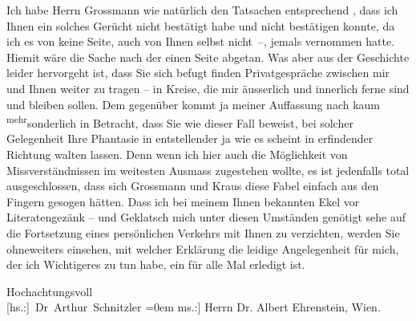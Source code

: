 \pstart
           Ich habe Herrn Grossmann wie natürlich den
               Tatsachen entsprechend \label{K_L02008-2v}\label{K_L02008-2}, dass ich Ihnen ein solches Gerücht nicht
               bestätigt habe und nicht bestätigen konnte, da ich es von keine Seite, auch von Ihnen
               selbst nicht –, jemals vernommen hatte. Hiemit wäre die Sache nach der einen Seite
               abgetan. Was aber aus der Geschichte leider hervorgeht ist, dass Sie sich befugt
               finden Privatge{\pb}spräche zwischen mir und Ihnen weiter zu tragen –
               in Kreise, die mir äusserlich und innerlich ferne sind und bleiben sollen. Dem
               gegenüber kommt ja meine\introOben{}r\introOben{} Auffassung \introOben{}nach\introOben{} kaum \substVorne{}\textsuperscript{mehr}\substDazwischen{}sonderlich\substHinten{} in Betracht, dass Sie wie dieser Fall beweist, bei solcher Gelegenheit Ihre
               Phantasie in entstellender ja wie es scheint in erfindender Richtung walten lassen.
               Denn wenn ich hier auch die Möglichkeit von Missverständnissen im weitesten Ausmass
               zugestehen wollte, es ist jedenfalls total ausgeschlossen, dass sich Grossmann und Kraus diese Fabel einfach aus den Fingern gesogen hätten. Dass ich bei
               meinem Ihnen bekannten Ekel vor Literatengezänk – und Geklatsch mich unter diesen
               Umständen genötigt sehe auf die Fortsetzung eines persönlichen Verkehrs mit Ihnen zu
               verzichten, werden Sie ohneweiters einsehen, mit welcher Erklärung die leidige
               Angelegenheit für mich, der ich Wichtigeres zu tun habe, ein für alle Mal erledigt
               ist.\pend
           
\pstart
           Hochachtungsvoll{\\[\baselineskip]}\spacefill\mbox{{[}hs.:{]} Dr Arthur Schnitzler}\pend
           \leftskip=0em{}
\pstart
           \noindent{}{[}ms.:{]} Herrn Dr. Albert Ehrenstein, Wien.\pend
           \endnumbering{}  \newcommand{\dateiname}{L02008}\newcommand{\titel}{Arthur Schnitzler an Albert Ehrenstein, 9. 2. 1911}\newcommand{\editorInnen}{Martin Anton Müller und Gerd-Hermann Susen}
